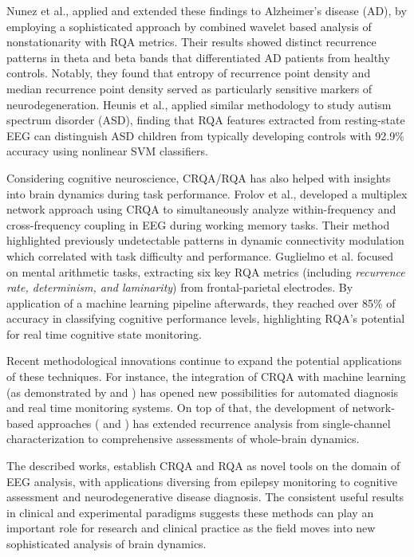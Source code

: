 \documentclass{article}
\begin{document}
		Nunez et al.\cite{nunez2020characterization}, applied and extended these findings 
		to Alzheimer's disease (AD), by employing a 
		sophisticated approach by combined wavelet based analysis of nonstationarity 
		with RQA metrics. Their results showed distinct recurrence patterns in theta 
		and beta bands that differentiated AD patients from healthy controls. 
		Notably, they found that entropy of recurrence point density and median recurrence point density served 
		as particularly sensitive markers of neurodegeneration.
		Heunis et al.\cite{heunis2018}, applied similar methodology to study autism spectrum disorder (ASD), 
		finding that RQA features extracted from resting-state EEG can distinguish ASD children 
		from typically developing controls with 92.9\% accuracy using nonlinear SVM classifiers.

		Considering cognitive neuroscience, CRQA/RQA has also helped with insights into brain dynamics 
		during task performance. Frolov et al.\cite{frolov}, developed a multiplex network approach using 
		CRQA to simultaneously analyze within-frequency and cross-frequency coupling in 
		EEG during working memory tasks. Their method highlighted previously undetectable 
		patterns in dynamic connectivity modulation which correlated with task difficulty and performance. 
		Guglielmo et al.\cite{guglielmo} focused on mental arithmetic tasks, 
		extracting six key RQA metrics (including \textit{recurrence rate, determinism, and laminarity}) 
		from frontal-parietal electrodes. By application of a machine learning pipeline afterwards, they reached over 85\% of accuracy 
		in classifying cognitive performance levels, highlighting RQA's potential for real time 
		cognitive state monitoring.

		Recent methodological innovations continue to expand the potential applications of these techniques. 
		For instance, the integration of CRQA with machine learning (as demonstrated by \cite{guglielmo} and \cite{palanisamy2024}) 
		has opened new possibilities for automated diagnosis and real time monitoring systems. On top of that, 
		the development of network-based approaches (\cite{frolov} and \cite{lopes}) 
		has extended recurrence analysis from single-channel characterization to comprehensive assessments of whole-brain dynamics.

		The described works, establish CRQA and RQA as novel tools on the domain of EEG analysis, 
		with applications diversing from epilepsy monitoring to cognitive assessment and neurodegenerative 
		disease diagnosis. The consistent useful results in clinical and experimental paradigms suggests 
		these methods can play an important role for research and clinical practice as the field
		moves into new sophisticated analysis of brain dynamics.

	\newpage





\end{document}
